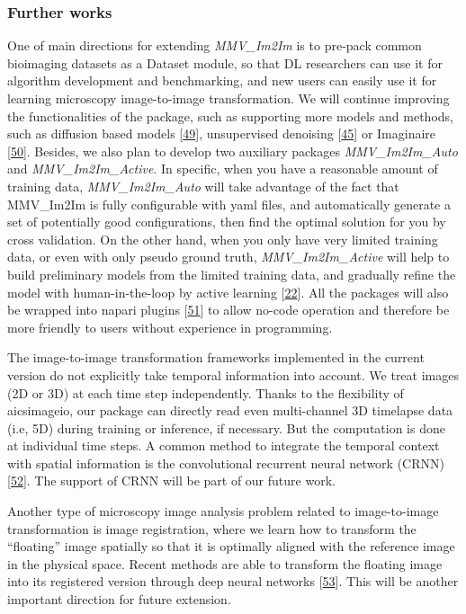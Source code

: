 \hypertarget{further-works}{%
\subsubsection{Further works}\label{further-works}}

One of main directions for extending \emph{MMV\_Im2Im} is to pre-pack common bioimaging datasets as a Dataset module, so that DL researchers can use it for algorithm development and benchmarking, and new users can easily use it for learning microscopy image-to-image transformation. We will continue improving the functionalities of the package, such as supporting more models and methods, such as diffusion based models {[}\protect\hyperlink{ref-1A3yurr7m}{49}{]}, unsupervised denoising {[}\protect\hyperlink{ref-4vnyY9J9}{45}{]} or Imaginaire {[}\protect\hyperlink{ref-vzOBQiEH}{50}{]}. Besides, we also plan to develop two auxiliary packages \emph{MMV\_Im2Im\_Auto} and \emph{MMV\_Im2Im\_Active}. In specific, when you have a reasonable amount of training data, \emph{MMV\_Im2Im\_Auto} will take advantage of the fact that MMV\_Im2Im is fully configurable with yaml files, and automatically generate a set of potentially good configurations, then find the optimal solution for you by cross validation. On the other hand, when you only have very limited training data, or even with only pseudo ground truth, \emph{MMV\_Im2Im\_Active} will help to build preliminary models from the limited training data, and gradually refine the model with human-in-the-loop by active learning {[}\protect\hyperlink{ref-jM3v1UjQ}{22}{]}. All the packages will also be wrapped into napari plugins {[}\protect\hyperlink{ref-YEMgt2T4}{51}{]} to allow no-code operation and therefore be more friendly to users without experience in programming.

The image-to-image transformation frameworks implemented in the current version do not explicitly take temporal information into account. We treat images (2D or 3D) at each time step independently. Thanks to the flexibility of aicsimageio, our package can directly read even multi-channel 3D timelapse data (i.e, 5D) during training or inference, if necessary. But the computation is done at individual time steps. A common method to integrate the temporal context with spatial information is the convolutional recurrent neural network (CRNN) {[}\protect\hyperlink{ref-s2RBSHdH}{52}{]}. The support of CRNN will be part of our future work.

Another type of microscopy image analysis problem related to image-to-image transformation is image registration, where we learn how to transform the ``floating'' image spatially so that it is optimally aligned with the reference image in the physical space. Recent methods are able to transform the floating image into its registered version through deep neural networks {[}\protect\hyperlink{ref-1Fh9QLxl9}{53}{]}. This will be another important direction for future extension.


